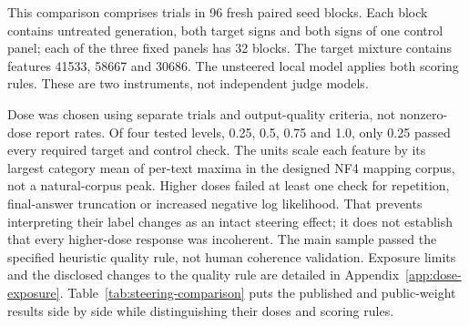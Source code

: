 \documentclass[11pt]{article}
\begin{document}
This comparison comprises \DoseMainTrials{} trials in 96 fresh paired seed
blocks. Each block contains untreated generation, both target signs and
both signs of one control panel; each of the three fixed panels has 32
blocks. The target mixture contains features 41533, 58667 and 30686.
The unsteered local model applies both scoring rules. These are two
instruments, not independent judge models.

Dose was chosen using \DoseMainCalibrationTrials{} separate trials and
output-quality criteria, not nonzero-dose report rates. Of four tested
levels, 0.25, 0.5, 0.75 and 1.0, only 0.25 passed every required target and
control check. The units scale each feature by its largest category mean
of per-text maxima in the designed NF4 mapping corpus, not a natural-corpus
peak. Higher doses failed at least one check for repetition, final-answer
truncation or increased negative log likelihood. That prevents interpreting
their label changes as an intact steering effect; it does not establish
that every higher-dose response was incoherent. The main sample passed
the specified heuristic quality rule, not human coherence validation.
Exposure limits and the disclosed changes to the quality rule are detailed
in Appendix~\ref{app:dose-exposure}.
Table~\ref{tab:steering-comparison} puts the published and public-weight
results side by side while distinguishing their doses and scoring rules.
\end{document}
